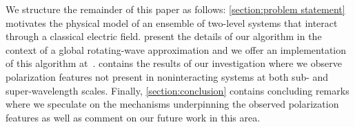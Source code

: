 We structure the remainder of this paper as follows: \cref{section:problem statement} motivates the physical model of an ensemble of two-level systems that interact through a classical electric field.
 present the details of our algorithm in the context of a global rotating-wave approximation and we offer an implementation of this algorithm at~\cite{githubpage}.
 contains the results of our investigation where we observe polarization features not present in noninteracting systems at both sub- and super-wavelength scales.
Finally, \cref{section:conclusion} contains concluding remarks where we speculate on the mechanisms underpinning the observed polarization features as well as comment on our future work in this area.
